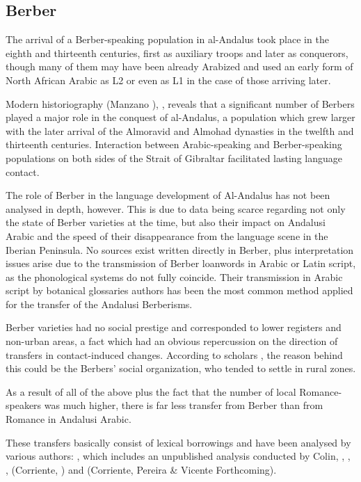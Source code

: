 \documentclass[output=paper,modfonts,nonflat]{langsci/langscibook}
\begin{document}
\subsection{Berber}



The arrival of a Berber-speaking population in al-Andalus took place in the eighth and thirteenth centuries, first as auxiliary troops and later as conquerors, though many of them may have been already Arabized and used an early form of North African Arabic as L2 or even as L1 in the case of those arriving later. 

Modern historiography (Manzano \citealt{Moreno1990}), \citep{Guichard1995}, \citep{Chalmeta2003} reveals that a significant number of Berbers played a major role in the conquest of al-Andalus, a population which grew larger with the later arrival of the Almoravid and Almohad dynasties in the twelfth and thirteenth centuries. Interaction between Arabic-speaking and Berber-speaking populations on both sides of the Strait of Gibraltar facilitated lasting language contact. 

The role of Berber in the language development of Al-Andalus has not been analysed in depth, however. This is due to data being scarce regarding not only the state of Berber varieties at the time, but also their impact on Andalusi Arabic and the speed of their disappearance from the language scene in the Iberian Peninsula. No sources exist written directly in Berber, plus interpretation issues arise due to the transmission of Berber loanwords in Arabic or Latin script, as the phonological systems do not fully coincide. Their transmission in Arabic script by botanical glossaries authors has been the most common method applied for the transfer of the Andalusi Berberisms.  

Berber varieties had no social prestige and corresponded to lower registers and non-urban areas, a fact which had an obvious repercussion on the direction of transfers in contact-induced changes. According to scholars \citep[160]{Chalmeta2003}, \citep{Guichard1995} the reason behind this could be the Berbers’ social organization, who tended to settle in rural zones. 

As a result of all of the above plus the fact that the number of local Romance-speakers was much higher, there is far less transfer from Berber than from Romance in Andalusi Arabic. 

These transfers basically consist of lexical borrowings and have been analysed by various authors: \citep{Ferrando1997}, which includes an unpublished analysis conducted by Colin, \citep{Corriente1981}, \citep{Corriente1998b}, \citep{Corriente2002}, (Corriente, \citealt{PereiraVicente2017}) and (Corriente, Pereira \& Vicente Forthcoming).
\end{document}
